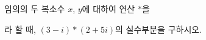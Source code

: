 임의의 두 복소수 $x$, $y$에 대하여 연산 $*$을\par\smallskip{}\par\smallskip\noindent 라 할 때, $(3-i)*(2+5i)$의 실수부분을 구하시오.
